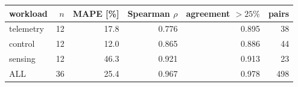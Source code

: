 \small
\begin{tabular}{lrrrrr}
\toprule
workload & $n$ & MAPE [\%] & Spearman $\rho$ & agreement $>25\%$ & pairs \\
\midrule
telemetry & 12 & 17.8 & 0.776 & 0.895 & 38 \\
control & 12 & 12.0 & 0.865 & 0.886 & 44 \\
sensing & 12 & 46.3 & 0.921 & 0.913 & 23 \\
ALL & 36 & 25.4 & 0.967 & 0.978 & 498 \\
\bottomrule
\end{tabular}
